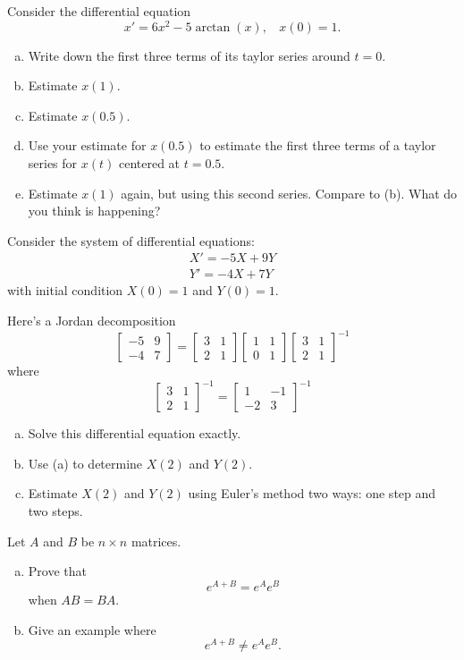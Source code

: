 \documentclass{article}
\newcommand{\inv}{^{-1}}
\begin{document}
\begin{problem}
    Consider the differential equation
    \[x' = 6x^2 - 5\arctan(x),\ \ \ \ x(0) = 1.\]
    
    \begin{enumerate}[a)]
        \item Write down the first three terms of its taylor series around \(t=0\).
        \item Estimate \(x(1)\).
        \item Estimate \(x(0.5)\).
        \item Use your estimate for \(x(0.5)\) to estimate the first three terms of a taylor series for \(x(t)\) centered at \(t=0.5\).
        \item Estimate \(x(1)\) again, but using this second series. Compare to (b). What do you think is happening?
    \end{enumerate}
\end{problem}

\begin{problem}
    Consider the system of differential equations:
    \begin{align*}
        X' = -5X + 9Y\\
        Y' = -4X + 7Y
    \end{align*}
    with initial condition \(X(0) = 1\) and \(Y(0) = 1\).
    
    Here's a Jordan decomposition
    \[\begin{bmatrix}
        -5&9\\
        -4&7
    \end{bmatrix}=
    \begin{bmatrix}
        3&1\\2&1
    \end{bmatrix}
    \begin{bmatrix}
        1&1\\0&1
    \end{bmatrix}
    \begin{bmatrix}
        3&1\\2&1
    \end{bmatrix}\inv\]
    where
    \[
    \begin{bmatrix}
        3&1\\2&1
    \end{bmatrix}\inv=
    \begin{bmatrix}
        1&-1\\-2&3
    \end{bmatrix}\inv\]

    \begin{enumerate}[a)]
        \item Solve this differential equation exactly.
        \item Use (a) to determine \(X(2)\) and \(Y(2)\).
        \item Estimate \(X(2)\) and \(Y(2)\) using Euler's method two ways: one step and two steps.
    \end{enumerate}
\end{problem}


\begin{problem}
[Bonus]
    Let \(A\) and \(B\) be \(n\times n\) matrices.
    \begin{enumerate}[a)]
        \item Prove that
        \[e^{A+B} = e^Ae^B\]
        when \(AB=BA\).
        \item Give an example where
        \[e^{A+B} \neq e^Ae^B.\]
    \end{enumerate}
\end{problem}
\end{document}
